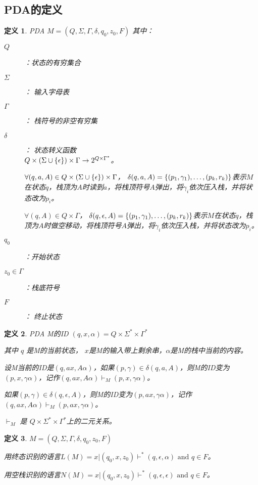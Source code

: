 \documentclass[twocolumn,zihao=5,linespread=1,heading=false,autoindent=0pt]{ctexart}
\DeclarePairedDelimiter{\set}{\{}{\}}
\theoremstyle{exampstyle} \newtheorem{definition}{定义}[section]
\theoremstyle{exampstyle} \newtheorem{example}{例}[section]
\theoremstyle{exampstyle} \newtheorem{theorem}{定理}[section]
\theoremstyle{exampstyle} \newtheorem{lemma}{引理}[section]
\theoremstyle{exampstyle} \newtheorem{myproof}{证明}[section]
\begin{document}
\subsection{PDA的定义}
\begin{definition}
    PDA $M = (Q, \Sigma, \Gamma, \delta, q_0, z_0, F)$
    其中：
    \begin{description}
        \item[$Q$]：状态的有穷集合
        \item[$\Sigma$]： 输入字母表
        \item[$\Gamma$]： 栈符号的非空有穷集
        \item[$\delta$]： 状态转义函数\\
            $Q\times (\Sigma \cup \set{\epsilon}) \times \Gamma \to 2^{Q \times \Gamma^*} $。 
            
            $\forall (q,a,A) \in Q\times (\Sigma \cup \set{\epsilon}) \times \Gamma$，
            $\delta(q,a,A) = \set{(p_1,\gamma_1),\dots,(p_k,r_k)}$表示$M$在状态$q$，栈顶为$A
            $时读到$a$，将栈顶符号$A$弹出，将$\gamma_i$依次压入栈，并将状态改为$p_i$。

            $\forall (q,A) \in Q\times \Gamma$，
            $\delta(q,\epsilon,A) = \set{(p_1,\gamma_1),\dots,(p_k,r_k)}$表示$M$在状态$q$，栈顶为$A
            $时做空移动，将栈顶符号$A$弹出，将$\gamma_i$依次压入栈，并将状态改为$p_i$。
        \item[$q_0$]：开始状态
        \item[$z_0 \in \Gamma$]：栈底符号
        \item[$F$]： 终止状态 
    \end{description}
\end{definition}

\begin{definition}
    PDA M的ID $(q, x, \alpha) = Q \times \Sigma^* \times \Gamma^*$

    其中 $q$ 是M的当前状态， $x$是M的输入带上剩余串，$\alpha$是M的栈中当前的内容。

    设M当前的ID是$(q, ax, A\alpha)$，如果$(p, \gamma) \in \delta(q, a, A)$，则M的ID变为$(p, x, \gamma \alpha)$，记作$(q, ax, A\alpha) \vdash_M (p, x, \gamma\alpha)$。

    如果$(p, \gamma) \in \delta(q, \epsilon, A)$，则M的ID变为$(p, ax, \gamma \alpha)$，记作$(q, ax, A\alpha) \vdash_M (p, ax, \gamma\alpha)$。
    
    $\vdash_M$ 是 $Q \times \Sigma^* \times \Gamma^*$上的二元关系。
\end{definition}

\begin{definition}
    $M = (Q, \Sigma, \Gamma, \delta, q_0, z_0, F)$

    用终态识别的语言$L(M) = {x | (q_0, x, z_0) \vdash^* (q, \epsilon, \alpha) \text{ and } q \in F}$。

    用空栈识别的语言$N(M) = {x | (q_0, x, z_0) \vdash^* (q, \epsilon, \epsilon) \text{ and } q \in F}$。
\end{definition}
\end{document}

